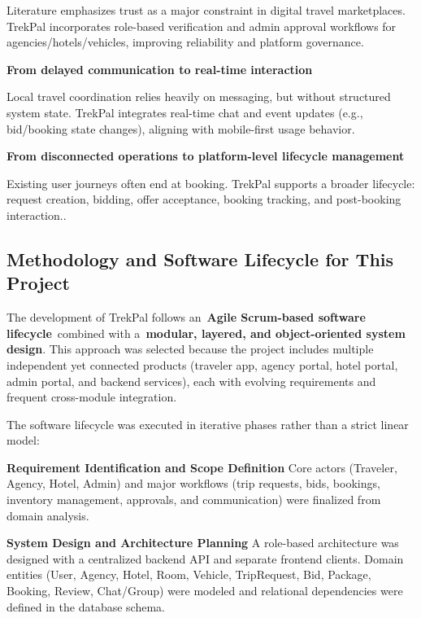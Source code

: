 \documentclass[12pt,a4paper]{article}
\newlength{\ThesisParagraphIndent}
\newcommand{\ThesisParagraph}[1]{%
  \par\begingroup
  \setlength{\leftskip}{\ThesisParagraphIndent}%
  \setlength{\parindent}{0pt}%
  \noindent#1\par
  \endgroup}
\begin{document}
\ThesisParagraph{Literature emphasizes trust as a major constraint in digital travel marketplaces. TrekPal incorporates role-based verification and admin approval workflows for agencies/hotels/vehicles, improving reliability and platform governance.}


\ThesisParagraph{\textbf{From delayed communication to real-time interaction}}


\ThesisParagraph{Local travel coordination relies heavily on messaging, but without structured system state. TrekPal integrates real-time chat and event updates (e.g., bid/booking state changes), aligning with mobile-first usage behavior.}


\ThesisParagraph{\textbf{From disconnected operations to platform-level lifecycle management}}


\ThesisParagraph{Existing user journeys often end at booking. TrekPal supports a broader lifecycle: request creation, bidding, offer acceptance, booking tracking, and post-booking interaction..}


\subsection{Methodology and Software Lifecycle for This Project}

\ThesisParagraph{The development of TrekPal follows an~\textbf{Agile Scrum-based software lifecycle}~combined with a~\textbf{modular, layered, and object-oriented system design}. This approach was selected because the project includes multiple independent yet connected products (traveler app, agency portal, hotel portal, admin portal, and backend services), each with evolving requirements and frequent cross-module integration.}


\ThesisParagraph{The software lifecycle was executed in iterative phases rather than a strict linear model:}


\begin{list}{}{\setlength{\leftmargin}{\dimexpr\ThesisParagraphIndent+1.5em\relax}\setlength{\labelsep}{0.5em}\setlength{\topsep}{2pt}\setlength{\parsep}{0pt}}
\item[1.] \textbf{Requirement Identification and Scope Definition}\newline{} Core actors (Traveler, Agency, Hotel, Admin) and major workflows (trip requests, bids, bookings, inventory management, approvals, and communication) were finalized from domain analysis.
\end{list}


\begin{list}{}{\setlength{\leftmargin}{\dimexpr\ThesisParagraphIndent+1.5em\relax}\setlength{\labelsep}{0.5em}\setlength{\topsep}{2pt}\setlength{\parsep}{0pt}}
\item[2.] \textbf{System Design and Architecture Planning}\newline{} A role-based architecture was designed with a centralized backend API and separate frontend clients. Domain entities (User, Agency, Hotel, Room, Vehicle, TripRequest, Bid, Package, Booking, Review, Chat/Group) were modeled and relational dependencies were defined in the database schema.
\end{list}
\end{document}
